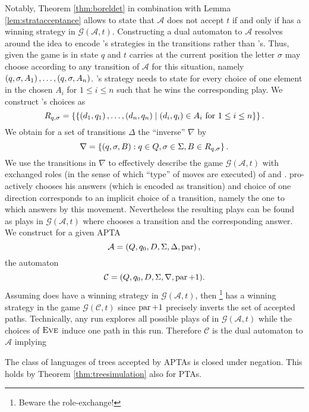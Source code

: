 Notably, Theorem \ref{thm:boreldet} in combination with Lemma
\ref{lem:stratacceptance} allows to state that $\mathcal{A}$ does not accept
$t$ if and only if \adam{} has a winning strategy in
$\mathcal{G}(\mathcal{A},t)$. Constructing a dual automaton to $\mathcal{A}$
resolves around the idea to encode \adam{}'s strategies in the transitions 
rather than \eve{}'s. Thus, given the game is in state $q$ and $t$ carries at 
the current position the letter $\sigma$ \eve{} may choose according to any 
transition of $\mathcal{A}$ for this situation, namely 
$\left(q,\sigma,A_{1}\right),\dots,\left(q,\sigma,A_{n}\right)$. 
\adam{}'s strategy needs to state for every choice of \eve{} one element in the 
chosen $A_{i}$ for $1\leq i\leq n$ such that he wins the corresponding play. We
construct \adam{}'s choices as
\begin{equation*}
  R_{q,\sigma} = \left\{
    \left\{
      \left(d_{1}, q_{1}\right),\dots,\left(d_{n},q_{n}\right)\mid
      \left(d_{i}, q_{i}\right)\in A_{i}\text{ for }1\leq i\leq n
    \right\}
  \right\}.
\end{equation*}
We obtain for a set of transitions $\Delta$ the \enquote{inverse} $\nabla$ by
\begin{equation*}
  \nabla = \left\{
    \left(q, \sigma, B\right):q\in Q, \sigma\in\Sigma, B\in R_{q,\sigma}
  \right\}.
\end{equation*}
We use the transitions in $\nabla$ to effectively describe the game 
$\mathcal{G}(\mathcal{A}, t)$ with exchanged roles (in the sense of which 
\enquote{type} of moves are executed) of \eve{} and \adam{}. \adam{} 
pro-actively chooses his answers (which is encoded as transition) and \eve{} 
choice of one direction corresponds to an implicit choice of a transition, 
namely the one to which \adam{} answers by this movement. Nevertheless the 
resulting plays can be found as plays in $\mathcal{G}(\mathcal{A}, t)$ where
\eve{} chooses a transition and \adam{} the corresponding answer. We construct 
for a given 
\ac{APTA}
\begin{equation*}
  \mathcal{A} = \left(Q, q_{0}, D, \Sigma, \Delta, \operatorname{par}\right),
\end{equation*}
the automaton
\begin{equation*}
  \mathcal{C} = (Q, q_{0}, D, \Sigma, \nabla, \operatorname{par} + 1).
\end{equation*}
Assuming \adam{} does have a winning strategy in $\mathcal{G}(\mathcal{A}, t)$, 
then \eve{}\footnote{Beware the role-exchange!} has a winning strategy in the 
game $\mathcal{G}(\mathcal{C}, t)$ since $\operatorname{par} + 1$ precisely inverts the
set of accepted paths. Technically, any run explores all possible plays of 
\adam{} in $\mathcal{G}(\mathcal{A}, t)$ while the choices of $\textsc{Eve}{}$ induce
one path in this run. Therefore $\mathcal{C}$ is the dual automaton to 
$\mathcal{A}$ implying
\begin{proposition}
  The class of languages of trees accepted by \acp{APTA} is closed under
  negation. This holds by Theorem \ref{thm:treesimulation} also for \acp{PTA}.
  \label{prop:atanegation}
\end{proposition}

